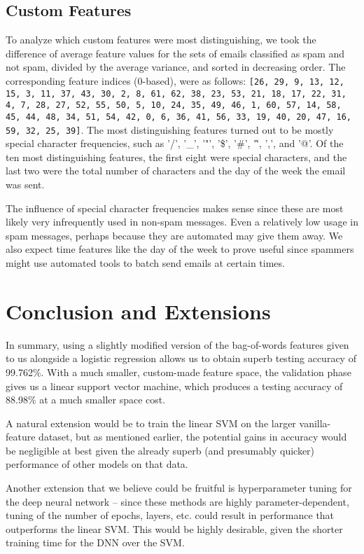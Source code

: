 \documentclass{article} %
\begin{document}
\subsection{Custom Features}
To analyze which custom features were most distinguishing, we took the difference of average feature values for the sets of emails classified as spam and not spam, divided by the average variance, and sorted in decreasing order. The corresponding feature indices (0-based), were as follows: \lstinline|[26, 29, 9, 13, 12, 15, 3, 11, 37, 43, 30, 2, 8, 61, 62, 38, 23, 53, 21, 18, 17, 22, 31, 4, 7, 28, 27, 52, 55, 50, 5, 10, 24, 35, 49, 46, 1, 60, 57, 14, 58, 45, 44, 48, 34, 51, 54, 42, 0, 6, 36, 41, 56, 33, 19, 40, 20, 47, 16, 59, 32, 25, 39]|. The most distinguishing features turned out to be mostly special character frequencies, such as '/', '\_', '"', '\$', '\#', '\^', ',', and '@'. Of the ten most distinguishing features, the first eight were special characters, and the last two were the total number of characters and the day of the week the email was sent. \par
The influence of special character frequencies makes sense since these are most likely very infrequently used in non-spam messages. Even a relatively low usage in spam messages, perhaps because they are automated may give them away. We also expect time features like the day of the week to prove useful since spammers might use automated tools to batch send emails at certain times.

\section{Conclusion and Extensions}
In summary, using a slightly modified version of the bag-of-words features given to us alongside a logistic regression allows us to obtain superb testing accuracy of 99.762\%.  With a much smaller, custom-made feature space, the validation phase gives us a linear support vector machine, which produces a testing accuracy of 88.98\% at a much smaller space cost.\par 
A natural extension would be to train the linear SVM on the larger vanilla-feature dataset, but as mentioned earlier, the potential gains in accuracy would be negligible at best given the already superb (and presumably quicker) performance of other models on that data.\par 
Another extension that we believe could be fruitful is hyperparameter tuning for the deep neural network -- since these methods are highly parameter-dependent, tuning of the number of epochs, layers, etc. could result in performance that outperforms the linear SVM.  This would be highly desirable, given the shorter training time for the DNN over the SVM.
\end{document}
